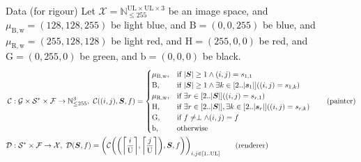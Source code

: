\documentclass[aspectratio=169,notheorems,8pt]{beamer}
\newcommand{\N}{\mathbb{N}}
\begin{document}
\begin{frame}{Data (for rigour)}
	Let $\mathcal{X}=\N_{\leq 255}^{\mathrm{U}\mathrm{L}\times\mathrm{U}\mathrm{L}\times 3}$ be an image space,
	and $\mu_\mathrm{B,w}=(128,128,255)$ be light blue,
	and $\mathrm{B}=(0,0,255)$ be blue,
	and $\mu_\mathrm{R,w}=(255,128,128)$ be light red,
	and $\mathrm{H}=(255,0,0)$ be red,
	and $\mathrm{G}=(0,255,0)$ be green,
	and $\mathrm{b}=(0,0,0)$ be black.
	\begin{align*}
		\mathcal{C}
		&:
		\mathcal{G}
		\times
		\mathcal{S}^{*}
		\times
		\mathcal{F}
		\to
		\N_{\leq 255}^{3}
		,\
		\mathcal{C}((i,j),\bm{S},f)
		=
		\begin{cases}
			\mu_\mathrm{B,w} %
			, &
			\text{if }
			\abs{\bm{S}}\geq 1\land(i,j)=s_{1,1}
			\\
			\mathrm{B} %
			, &
			\text{if }
			\abs{\bm{S}}\geq 1
			\land
			\exists k\in\mleft[2..\abs{\bm{s}_{1}}\mright]\mleft(
				(i,j)=s_{1,k}
			\mright)
			\\
			\mu_\mathrm{R,w} %
			, &
			\text{if }
			\exists r\in\mleft[2..\abs{\bm{S}}\mright]\mleft(
				(i,j)=s_{r,1}
			\mright)
			\\
			\mathrm{H} %
			, &
			\text{if }
			\exists r\in\mleft[2..\abs{\bm{S}}\mright],
			\exists k\in[2..\abs{\bm{s}_{r}}]\mleft(
				(i,j)=s_{r,k}
			\mright)
			\\
			\mathrm{G} %
			, &
			\text{if }
			f\neq\perp\land(i,j)=f
			\\
			\mathrm{b} %
			, &
			\text{otherwise}
		\end{cases}
		\tag{painter}
		\\
		\mathcal{D}
		&:
		\mathcal{S}^{*}
		\times
		\mathcal{F}
		\to
		\mathcal{X}
		,\
		\mathcal{D}(\bm{S},f)
		=
		\mleft(
			\mathcal{C}\mleft(
				\mleft(
					\mleft\lceil\frac{i}{\mathrm{U}}\mright\rceil,
					\mleft\lceil\frac{j}{\mathrm{U}}\mright\rceil
				\mright),
				\bm{S},
				f
			\mright)
		\mright)_{i,j\in[1..\mathrm{U}\mathrm{L}]}
		\tag{renderer}
	\end{align*}
\end{frame}
\end{document}
